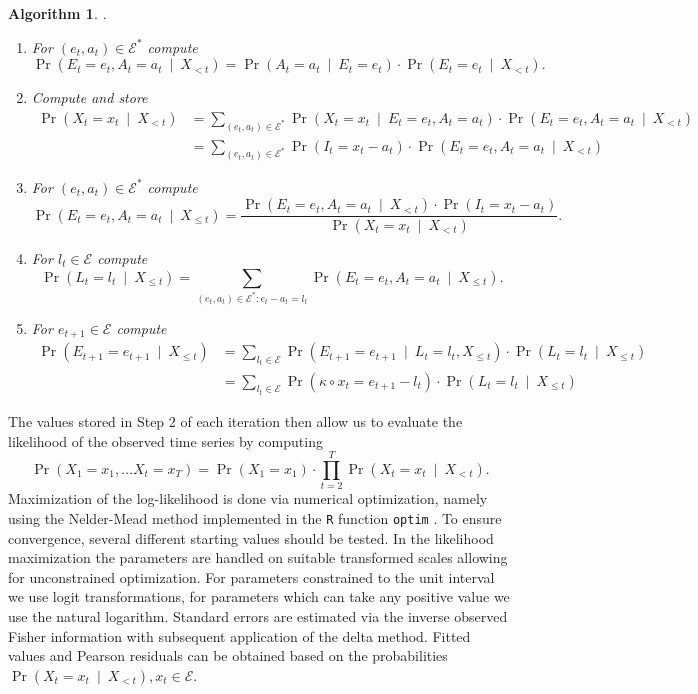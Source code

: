 \documentclass{article}
\newtheorem{algorithm}{Algorithm}
\begin{document}
\begin{algorithm}
.
\begin{enumerate}
\item For $(e_t, a_t) \in \mathcal{E}^*$ compute
$$
\Pr(E_t = e_t, A_t = a_t \ \mid \ X_{< t}) = \Pr(A_t = a_t \ \mid \ E_t = e_t)\cdot \Pr(E_t = e_t \ \mid \ X_{< t}).
$$
\item Compute and store
\begin{align*}
\Pr(X_t = x_t \ \mid \ X_{< t}) & = \sum_{(e_t, a_t) \in \mathcal{E}^*} \Pr(X_t = x_t \ \mid \ E_t = e_t, A_t = a_t) \cdot \Pr(E_t = e_t, A_t = a_t \ \mid \ X_{< t})\\
& = \sum_{(e_t, a_t) \in \mathcal{E}^*} \Pr(I_t = x_t - a_t) \cdot \Pr(E_t = e_t, A_t = a_t \ \mid \ X_{< t})
\end{align*}
\item For $(e_t, a_t) \in \mathcal{E}^*$ compute 
$$
\Pr(E_t = e_t, A_t = a_t \ \mid \ X_{\leq t}) = \frac{\Pr(E_t = e_t, A_t = a_t \ \mid \ X_{< t}) \cdot \Pr(I_t = x_t - a_t)}{\Pr(X_t = x_t \ \mid \ X_{< t})}.
$$
\item For $l_t \in \mathcal{E}$ compute
$$
\Pr(L_t = l_t \ \mid \ X_{\leq t}) = \sum_{(e_t, a_t) \in \mathcal{E}^*: e_t - a_t = l_t} \Pr(E_t = e_t, A_t = a_t \ \mid \ X_{\leq t}).
$$
\item For $e_{t + 1} \in \mathcal{E}$ compute
\begin{align*}
\Pr(E_{t + 1} = e_{t + 1} \ \mid \ X_{\leq t}) & = \sum_{l_t \in \mathcal{E}} \Pr(E_{t + 1} = e_{t + 1} \ \mid \ L_t = l_t, X_{\leq t}) \cdot \Pr(L_t = l_t \ \mid \ X_{\leq t})\\
& = \sum_{l_t \in \mathcal{E}} \Pr(\kappa \circ x_t = e_{t + 1} - l_t) \cdot \Pr(L_t = l_t \ \mid \ X_{\leq t})
\end{align*}
\end{enumerate}
\end{algorithm}
The values stored in Step 2 of each iteration then allow us to evaluate the likelihood of the observed time series by computing
$$
\Pr(X_1 = x_1, \dots X_t = x_T) = \Pr(X_1 = x_1) \cdot \prod_{t = 2}^T \Pr(X_t = x_t \ \mid \ X_{< t}).
$$
Maximization of the log-likelihood is done via numerical optimization, namely using the Nelder-Mead method implemented in the \texttt{R} function \texttt{optim} \citep{RDCT2008}. To ensure convergence, several different starting values should be tested. In the likelihood maximization the parameters are handled on suitable transformed scales allowing for unconstrained optimization. For parameters constrained to the unit interval we use logit transformations, for parameters which can take any positive value we use the natural logarithm. Standard errors are estimated via the inverse observed Fisher information with subsequent application of the delta method. Fitted values and Pearson residuals can be obtained based on the probabilities $\Pr(X_t = x_t \ \mid \ X_{< t}), x_t \in \mathcal{E}$.
\end{document}
